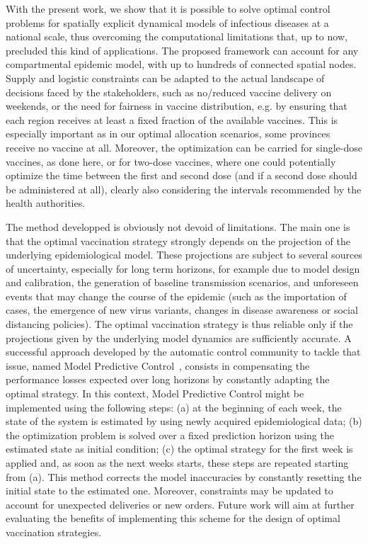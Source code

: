 With the present work, we show that it is possible to solve optimal control problems for spatially explicit dynamical models of infectious diseases at a national scale, thus overcoming the computational limitations that, up to now, precluded this kind of applications. The proposed framework can account for any compartmental epidemic model, with up to hundreds of connected spatial nodes. Supply and logistic constraints can be adapted to the actual landscape of decisions faced by the stakeholders, such as no/reduced vaccine delivery on weekends, or the need for fairness in vaccine distribution, e.g. by ensuring that each region receives at least a fixed fraction of the available vaccines. This is especially important as in our optimal allocation scenarios, some provinces receive no vaccine at all. Moreover, the optimization can be carried for single-dose vaccines, as done here, or for two-dose vaccines, where one could potentially optimize the time between the first and second dose (and if a second dose should be administered at all), clearly also considering the intervals recommended by the health authorities.

The method developped is obviously not devoid of limitations. The main one is that the optimal vaccination strategy strongly depends on the projection of the underlying epidemiological model. These projections are subject to several sources of uncertainty, especially for long term horizons, for example due to model design and calibration\cite{Cramer:EvaluationIndividualEnsemble:2021}, the generation of baseline transmission scenarios, and unforeseen events that may change the course of the epidemic (such as the importation of cases, the emergence of new virus variants, changes in disease awareness or social distancing policies). The optimal vaccination strategy is thus reliable only if the projections given by the underlying model dynamics are sufficiently accurate. A successful approach developed by the automatic control community to tackle that issue, named Model Predictive Control~\cite{Rawlings:ModelPredictiveControl:2017}, consists in compensating the performance losses expected over long horizons by constantly adapting the optimal strategy. In this context, Model Predictive Control might be implemented using the following steps: (a) at the beginning of each week, the state of the system is estimated by using newly acquired epidemiological data; (b) the optimization problem is solved over a fixed prediction horizon using the estimated state as initial condition; (c) the optimal strategy for the first week is applied and, as soon as the next weeks starts, these steps are repeated starting from (a). This method corrects the model inaccuracies by constantly resetting the initial state to the estimated one. Moreover, constraints may be updated to account for unexpected deliveries or new orders. Future work will aim at further evaluating the benefits of implementing this scheme for the design of optimal vaccination strategies.

